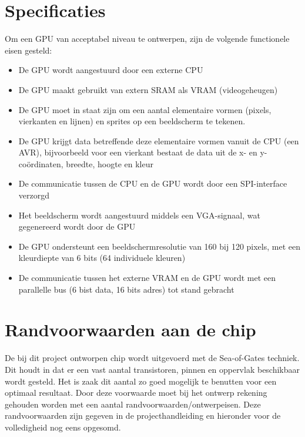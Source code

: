 \documentclass{scrartcl} %
\begin{document}
\section{Specificaties}
Om een GPU van acceptabel niveau te ontwerpen, zijn de volgende functionele eisen gesteld:

\begin{itemize}
	\item De GPU wordt aangestuurd door een externe CPU
	\item De GPU maakt gebruikt van extern SRAM als VRAM (videogeheugen)
	\item De GPU moet in staat zijn om een aantal elementaire vormen (pixels, vierkanten en lijnen) en sprites op een beeldscherm te tekenen.
	\item De GPU krijgt data betreffende deze elementaire vormen vanuit de CPU (een AVR), bijvoorbeeld voor een vierkant bestaat de data uit de x- en y-coördinaten, breedte, hoogte en kleur
	\item De communicatie tussen de CPU en de GPU wordt door een SPI-interface verzorgd
	\item Het beeldscherm wordt aangestuurd middels een VGA-signaal, wat gegenereerd wordt door de GPU
	\item De GPU ondersteunt een beeldschermresolutie van 160 bij 120 pixels, met een kleurdiepte van 6 bits (64 individuele kleuren)
	\item De communicatie tussen het externe VRAM en de GPU wordt met een parallelle bus (6 bist data, 16 bits adres) tot stand gebracht
\end{itemize}

\section {Randvoorwaarden aan de chip}

De bij dit project ontworpen chip wordt uitgevoerd met de Sea-of-Gates techniek. Dit houdt in dat er een vast aantal transistoren, pinnen en oppervlak beschikbaar wordt gesteld. Het is zaak dit aantal zo goed mogelijk te benutten voor een optimaal resultaat. Door deze voorwaarde moet bij het ontwerp rekening gehouden worden met een aantal randvoorwaarden/ontwerpeisen. Deze randvoorwaarden zijn gegeven in de projecthandleiding en hieronder voor de volledigheid nog eens opgesomd. \cite{epo3-manual}
\end{document}
